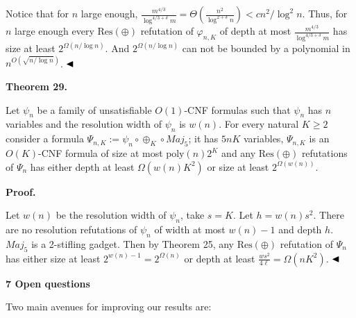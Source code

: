 Notice that for $n$ large enough,
$\frac{m^{4/3}}{\log^{4/3+\delta}m}=\Theta\left(\frac{n^{2}}{\log^{2+\delta}n}\right)<cn^{2}/\log^{2}n$. Thus, for $n$ large enough every $\mathrm{Res}(\oplus)$ refutation of $\varphi_{n,K}$ of depth at most $\frac{m^{4/3}}{\log^{4/3+\delta}m}$ has size at least $2^{\Omega(n/\log n)}$. And $2^{\Omega(n/\log n)}$ can not be bounded by a polynomial in $n^{O\left(\sqrt{n/\log n}\right)}$.
$\hfill\blacktriangleleft$\par



\par\medskip\noindent\textbf{
Theorem 29.
}\par



Let $\psi_{n}$ be a family of unsatisfiable $O(1)$-CNF formulas such that $\psi_{n}$ has $n$ variables and the resolution width
of $\psi_{n}$ is $w(n)$.
For every natural $K\geq 2$ consider a formula $\Psi_{n,K}:=\psi_{n}\circ\oplus_{K}\circ Maj_{5}$;
it has $5nK$ variables, $\Psi_{n,K}$ is an $O(K)$-CNF formula of size at most $\mathrm{poly}(n)2^{K}$ and any $\mathrm{Res}(\oplus)$
refutations of $\Psi_{n}$ has either depth at least $\Omega(w(n)K^{2})$ or size at least $2^{\Omega(w(n))}$.\par



\par\medskip\noindent\textbf{Proof.}\par


Let $w(n)$ be the resolution width of $\psi_{n}$, take $s=K$. Let $h=w(n)s^{2}$.
There are no resolution refutations of $\psi_{n}$ of width at most $w(n)-1$ and depth $h$. $Maj_{5}$ is a 2-stifling gadget.
Then by Theorem 25, any $\mathrm{Res}(\oplus)$ refutation of $\Psi_{n}$ has either size at least $2^{w(n)-1}=2^{\Omega(n)}$
or depth at least $\frac{ws^{2}}{4\ell}=\Omega(nK^{2})$.
$\hfill\blacktriangleleft$\par


\par\medskip\noindent\textbf{
7 Open questions}\par


Two main avenues for improving our results are:\par


